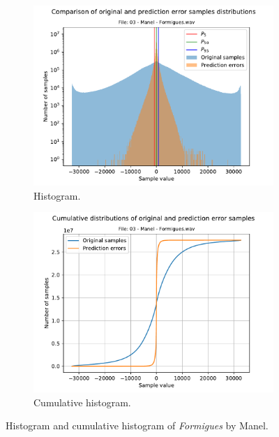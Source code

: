 \begin{figure}[h!]
	\centering
	\begin{subfigure}{0.5\textwidth}
		\centering
		\includegraphics[width=\linewidth]{images/03 - Manel - Formigues.wav_hist.pdf}
		\caption{Histogram.}
		\label{fig:hist_formiques}
	\end{subfigure}%
	\begin{subfigure}{0.5\textwidth}
		\centering
		\includegraphics[width=\linewidth]{images/03 - Manel - Formigues.wav_hist_cum.pdf}
		\caption{Cumulative histogram.}
		\label{fig:cum_hists_formigues}
	\end{subfigure}
	\caption{Histogram and cumulative histogram of \textit{Formigues} by Manel.}
	\label{fig:formigues}
\end{figure}

